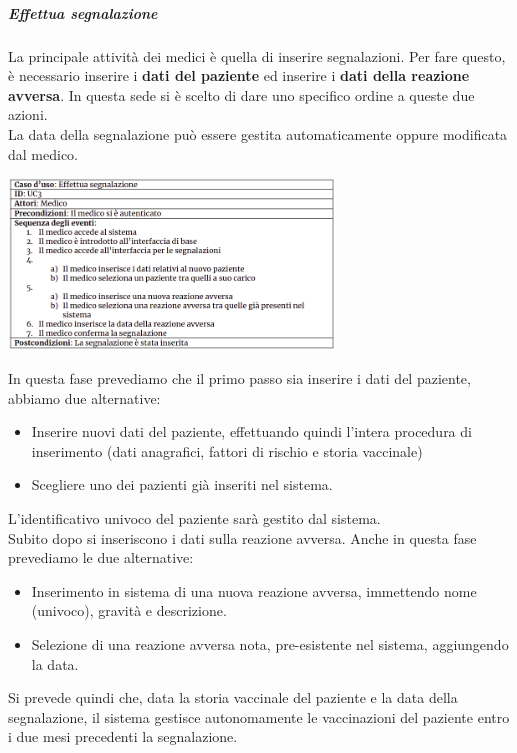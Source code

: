 \documentclass{article}
\begin{document}
\newpage
    \subparagraph*{Effettua segnalazione}
        La principale attività dei medici è quella di inserire segnalazioni. Per fare questo, è necessario
        inserire i \textbf{dati del paziente} ed inserire i \textbf{dati della reazione avversa}. In questa sede si è scelto di dare uno specifico ordine a queste due azioni.\\
        La data della segnalazione può essere gestita automaticamente oppure modificata dal medico.
            \begin{center}
                \includegraphics[width=0.65\textwidth]{pictures/UC3.png}
            \end{center}
        In questa fase prevediamo che il primo passo sia inserire i dati del paziente, abbiamo due alternative:
            \begin{itemize}
                \item Inserire nuovi dati del paziente, effettuando quindi l'intera procedura di inserimento (dati anagrafici, fattori di rischio e storia vaccinale)
                \item Scegliere uno dei pazienti già inseriti nel sistema.
            \end{itemize}
        L'identificativo univoco del paziente sarà gestito dal sistema.\\
        Subito dopo si inseriscono i dati sulla reazione avversa.
        Anche in questa fase prevediamo le due alternative:
            \begin{itemize}
                \item Inserimento in sistema di una nuova reazione avversa, immettendo nome (univoco), gravità e descrizione.
                \item Selezione di una reazione avversa nota, pre-esistente nel sistema, aggiungendo la data.
            \end{itemize}
        Si prevede quindi che, data la storia vaccinale del paziente e la data della segnalazione, il sistema gestisce autonomamente
        le vaccinazioni del paziente entro i due mesi precedenti la segnalazione.
\end{document}
